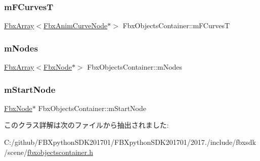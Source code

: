 \subsubsection{\texorpdfstring{m\+F\+CurvesT}{mFCurvesT}}
{\footnotesize\ttfamily \hyperlink{class_fbx_array}{Fbx\+Array}$<$\hyperlink{class_fbx_anim_curve_node}{Fbx\+Anim\+Curve\+Node}$\ast$$>$ Fbx\+Objects\+Container\+::m\+F\+CurvesT}

\mbox{\label{class_fbx_objects_container_a8d0ede6ba6ec874eb841593af719f063}} 
\subsubsection{\texorpdfstring{m\+Nodes}{mNodes}}
{\footnotesize\ttfamily \hyperlink{class_fbx_array}{Fbx\+Array}$<$\hyperlink{class_fbx_node}{Fbx\+Node}$\ast$$>$ Fbx\+Objects\+Container\+::m\+Nodes}

\mbox{\label{class_fbx_objects_container_a650407ad105a3029d29ac5b68e94b062}} 
\subsubsection{\texorpdfstring{m\+Start\+Node}{mStartNode}}
{\footnotesize\ttfamily \hyperlink{class_fbx_node}{Fbx\+Node}$\ast$ Fbx\+Objects\+Container\+::m\+Start\+Node\hspace{0.3cm}{\ttfamily [protected]}}



このクラス詳解は次のファイルから抽出されました\+:\begin{DoxyCompactItemize}
\item 
C\+:/github/\+F\+B\+Xpython\+S\+D\+K201701/\+F\+B\+Xpython\+S\+D\+K201701/2017./include/fbxsdk/scene/\hyperlink{fbxobjectscontainer_8h}{fbxobjectscontainer.\+h}\end{DoxyCompactItemize}
